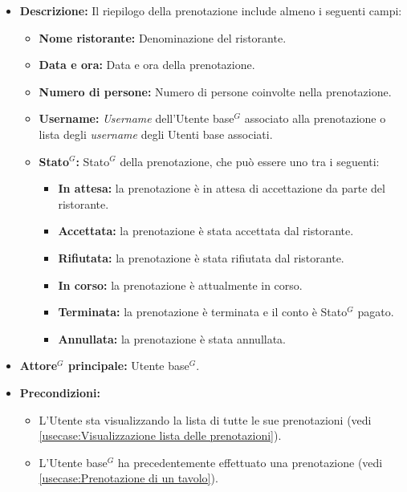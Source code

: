 \label{usecase:Visualizzazione del riepilogo prenotazione}
\begin{itemize}
	\item \textbf{Descrizione:}
	Il riepilogo della prenotazione include almeno i seguenti campi:
	\begin{itemize}
		\item \textbf{Nome ristorante:} Denominazione del ristorante.
		\item \textbf{Data e ora:} Data e ora della prenotazione.
		\item \textbf{Numero di persone:} Numero di persone coinvolte nella prenotazione.
		\item \textbf{Username:} \textit{Username} dell'\gls{Utente base}$^G$ associato alla prenotazione o lista degli \textit{username} degli Utenti base associati.

		\item \textbf{\gls{Stato}$^G$:} \gls{Stato}$^G$ della prenotazione, che può essere uno tra i seguenti:
			  \begin{itemize}
				  \item \textbf{In attesa:} la prenotazione è in attesa di accettazione da parte del ristorante.
				  \item \textbf{Accettata:} la prenotazione è stata accettata dal ristorante.
				  \item \textbf{Rifiutata:} la prenotazione è stata rifiutata dal ristorante.
				  \item \textbf{In corso:} la prenotazione è attualmente in corso.
				  \item \textbf{Terminata:} la prenotazione è terminata e il conto è \gls{Stato}$^G$ pagato.
				  \item \textbf{Annullata:} la prenotazione è stata annullata.
			  \end{itemize}
	\end{itemize}
	
	\item \textbf{\gls{Attore}$^G$ principale:} \gls{Utente base}$^G$.

	\item \textbf{Precondizioni:}
	      \begin{itemize}
		      \item L'Utente sta visualizzando la lista di tutte le sue prenotazioni (vedi \autoref{usecase:Visualizzazione lista delle prenotazioni}).
		      \item L'\gls{Utente base}$^G$ ha precedentemente effettuato una prenotazione (vedi \autoref{usecase:Prenotazione di un tavolo}).
	      \end{itemize}



\end{itemize}

